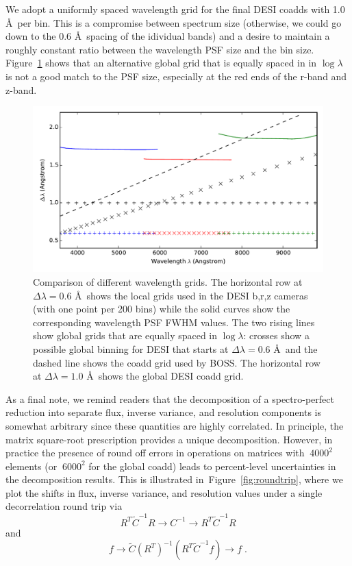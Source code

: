 \documentclass[12pt]{article}
\providecommand{\fig}[1]{Figure~\ref{fig:#1}}
\begin{document}
We adopt a uniformly spaced wavelength grid for the final DESI coadds with 1.0 \AA\ per bin. This is a compromise between spectrum size (otherwise, we could go down to the 0.6 \AA\ spacing of the idividual bands) and a desire to maintain a roughly constant ratio between the wavelength PSF size and the bin size. \fig{grids} shows that an alternative global grid that is equally spaced in in $\log\lambda$ is not a good match to the PSF size, especially at the red ends of the r-band and z-band.

\begin{figure}[htb]
\begin{center}
\includegraphics[width=5in]{fig/grids}
\caption{Comparison of different wavelength grids. The horizontal row at $\Delta\lambda = 0.6$ \AA\ shows the local grids used in the DESI b,r,z cameras (with one point per 200 bins) while the solid curves show the corresponding wavelength PSF FWHM values. The two rising lines show global grids that are equally spaced in $\log\lambda$: crosses show a possible global binning for DESI that starts at $\Delta\lambda = 0.6$ \AA\ and the dashed line shows the coadd grid used by BOSS. The horizontal row at $\Delta\lambda = 1.0$ \AA\ shows the global DESI coadd grid.}
\label{fig:grids}
\end{center}
\end{figure}

As a final note, we remind readers that the decomposition of a spectro-perfect reduction into separate flux, inverse variance, and resolution components is somewhat arbitrary since these quantities are highly correlated. In principle, the matrix square-root prescription provides a unique decomposition. However, in practice the presence of round off errors in operations on matrices with $~4000^2$ elements (or $~6000^2$ for the global coadd) leads to percent-level uncertainties in the decomposition results.  This is illustrated in~\fig{roundtrip}, where we plot the shifts in flux, inverse variance, and resolution values under a single decorrelation round trip via
\begin{equation}
R^T \tilde{C}^{-1} R \rightarrow C^{-1} \rightarrow R^T \tilde{C}^{-1} R
\end{equation}
and
\begin{equation}
f \rightarrow \tilde{C} (R^T)^{-1} \left( R^T \tilde{C}^{-1} f \right) \rightarrow f \; .
\end{equation}
\end{document}

